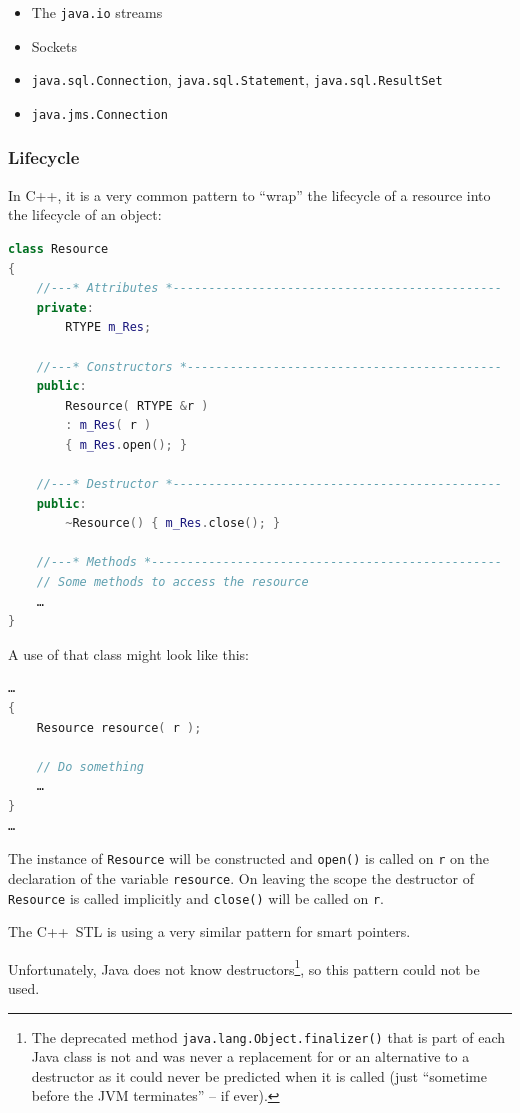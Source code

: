 \documentclass[11pt,a4paper, titlepage, parskip=half, headsepline, footsepline, cleardoublepage=current, headheight=1cm]{scrbook}
\begin{document}
\begin{itemize}
\item{The \lstinline|java.io| streams}
\item{Sockets}
\item{\lstinline|java.sql.Connection|, \lstinline|java.sql.Statement|, \lstinline|java.sql.ResultSet|}
\item{\lstinline|java.jms.Connection|}
\end{itemize}

\subsubsection{Lifecycle}\label{sec:Lifecycle}
In C++, it is a very common pattern to “wrap” the lifecycle of a resource into the lifecycle of an object:
\begin{lstlisting}[language=C++]
class Resource
{
    //---* Attributes *----------------------------------------------
    private:
        RTYPE m_Res;

    //---* Constructors *--------------------------------------------
    public:
        Resource( RTYPE &r )
        : m_Res( r )
        { m_Res.open(); }

    //---* Destructor *----------------------------------------------
    public:
        ~Resource() { m_Res.close(); }

    //---* Methods *-------------------------------------------------
    // Some methods to access the resource
    …
}
\end{lstlisting}
A use of that class might look like this:
\begin{lstlisting}[language=c++]
…
{
    Resource resource( r );

    // Do something
    …
}
…
\end{lstlisting}
The instance of \lstinline|Resource| will be constructed and \lstinline|open()| is called on \lstinline|r| on the declaration of the variable \lstinline|resource|. On leaving the scope the destructor of \lstinline|Resource| is called implicitly and \lstinline|close()| will be called on \lstinline|r|.

The C++~STL is using a very similar pattern for smart pointers.

Unfortunately, Java does not know destructors\footnote{The deprecated method \lstinline|java.lang.Object.finalizer()| that is part of each Java class is not and was never a replacement for or an alternative to a destructor as it could never be predicted when it is called (just “sometime before the JVM terminates” – if ever).}, so this pattern could not be used.
\end{document}
